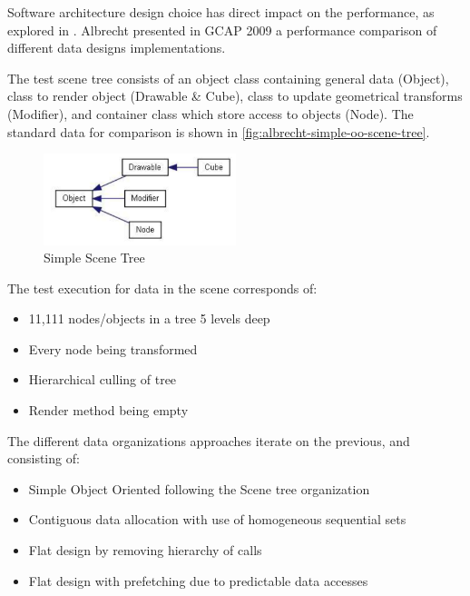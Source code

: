     Software architecture design choice has direct impact on the performance, as explored in \cite{albrecht-pitfalls-OOP-GCAP09}. Albrecht presented in GCAP 2009 a performance comparison of different data designs implementations. 
    
    The test scene tree consists of an object class containing general data (Object), class to render object (Drawable & Cube), class to update geometrical transforms (Modifier), and container class which store access to objects (Node). The standard data for comparison is shown in \autoref{fig:albrecht-simple-oo-scene-tree}. 
    
    \begin{figure}[H]
        \caption{
        \label{fig:albrecht-simple-oo-scene-tree}
            Simple Scene Tree
        }
        \begin{center}
        \includegraphics[width=0.5\textwidth]{images/albrecht-simple-oo-scene-tree.png}
        \end{center}
    \end{figure}    
    
    The test execution for data in the scene corresponds of:
    
    \begin{itemize}
        \item 11,111 nodes/objects in a tree 5 levels deep
        \item Every node being transformed
        \item Hierarchical culling of tree
        \item Render method being empty
    \end{itemize}
    
    The different data organizations approaches iterate on the previous, and consisting of:
    
    \begin{itemize}
        \item Simple Object Oriented following the Scene tree organization
        \item Contiguous data allocation with use of homogeneous sequential sets
        \item Flat design by removing hierarchy of calls
        \item Flat design with prefetching due to predictable data accesses
    \end{itemize}
    
